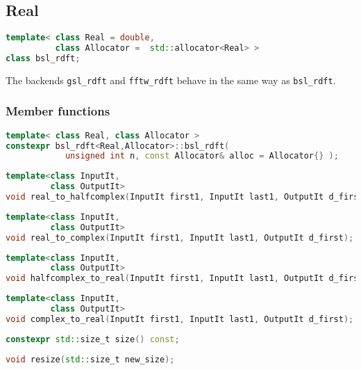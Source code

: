 \subsection{Real \dft}

\begin{lstlisting}[language=C++,caption=Real plan.]
template< class Real = double, 
          class Allocator =  std::allocator<Real> >
class bsl_rdft;
\end{lstlisting}

The backends \verb|gsl_rdft| and \verb|fftw_rdft| behave in the same way as
\verb|bsl_rdft|.

\subsubsection*{Member functions}

\begin{lstlisting}[language=C++,caption=Real plan constructor.]
template< class Real, class Allocator >
constexpr bsl_rdft<Real,Allocator>::bsl_rdft(
            unsigned int n, const Allocator& alloc = Allocator{} );
\end{lstlisting}
\begin{lstlisting}[language=C++,caption=Real to halfcomplex.]
template<class InputIt,
         class OutputIt>
void real_to_halfcomplex(InputIt first1, InputIt last1, OutputIt d_first);
\end{lstlisting}
\begin{lstlisting}[language=C++,caption=Real to complex.]
template<class InputIt,
         class OutputIt>
void real_to_complex(InputIt first1, InputIt last1, OutputIt d_first);
\end{lstlisting}
\begin{lstlisting}[language=C++,caption=Halfcomplex to real.]
template<class InputIt,
         class OutputIt>
void halfcomplex_to_real(InputIt first1, InputIt last1, OutputIt d_first);
\end{lstlisting}
\begin{lstlisting}[language=C++,caption=Complex to real.]
template<class InputIt,
         class OutputIt>
void complex_to_real(InputIt first1, InputIt last1, OutputIt d_first);
\end{lstlisting}
\begin{lstlisting}[language=C++,caption=Size.]
constexpr std::size_t size() const;
\end{lstlisting}
\begin{lstlisting}[language=C++,caption=Resize.]
void resize(std::size_t new_size);
\end{lstlisting}

